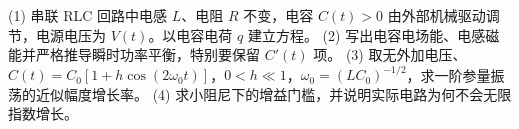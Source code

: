 (1) 串联 RLC 回路中电感 \(L\)、电阻 \(R\) 不变，电容 \(C(t)>0\) 由外部机械驱动调节，电源电压为 \(V(t)\)。以电容电荷 \(q\) 建立方程。
(2) 写出电容电场能、电感磁能并严格推导瞬时功率平衡，特别要保留 \(C'(t)\) 项。
(3) 取无外加电压、\(C(t)=C_0[1+h\cos(2\omega_0t)]\)，\(0<h\ll1\)，\(\omega_0=(LC_0)^{-1/2}\)，求一阶参量振荡的近似幅度增长率。
(4) 求小阻尼下的增益门槛，并说明实际电路为何不会无限指数增长。
